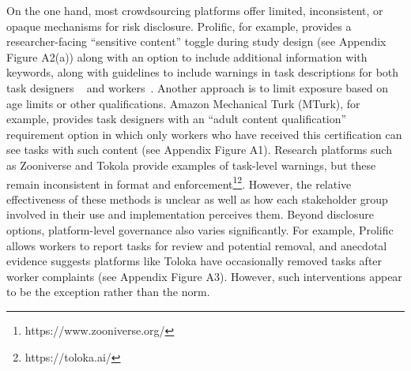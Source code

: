On the one hand, most crowdsourcing platforms offer limited, inconsistent, or opaque mechanisms for risk disclosure. %
Prolific, for example, provides a researcher-facing ``sensitive content'' toggle during study design (see Appendix Figure A2(a)) along with an option to include additional information with keywords, along with guidelines to include warnings in task descriptions for both task designers ~\cite{ProlificResearcherSensitive2025, ProlificAPIContentWarning2025} and workers~\cite{prolific2025participant}. Another approach is to limit exposure based on age limits or other qualifications. Amazon Mechanical Turk (MTurk), for example, provides task designers with an ``adult content qualification'' requirement option in which only workers who have received this certification can see tasks with such content (see Appendix Figure A1). Research platforms such as Zooniverse and Tokola provide examples of task-level warnings, but these remain inconsistent in format and enforcement\footnote{https://www.zooniverse.org/}\footnote{https://toloka.ai/}. However, the relative effectiveness of these methods is unclear as well as how each stakeholder group involved in their use and implementation perceives them.  
Beyond disclosure options, platform-level governance also varies significantly. %
For example, Prolific allows workers to report tasks for review and potential removal, and anecdotal evidence suggests platforms like Toloka have occasionally removed tasks after worker complaints (see Appendix Figure A3). However, such interventions appear to be the exception rather than the norm.

